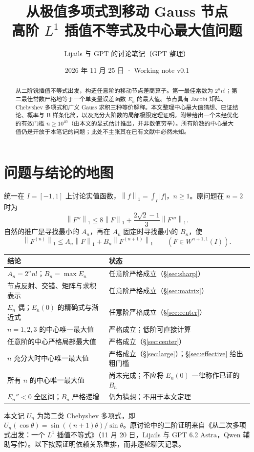 \documentclass[11pt,a4paper,fontset=fandol]{ctexart}
\title{\vspace{-1em}从极值多项式到移动 Gauss 节点\\[5pt]\large 高阶 $L^1$ 插值不等式及中心最大值问题}
\author{Lijails 与 GPT 的讨论笔记（GPT 整理）}
\date{2026 年 11 月 25 日 · Working note v0.1}
\newcommand{\norm}[1]{\left\|#1\right\|_1}
\theoremstyle{remark}\newtheorem{conjecture}{猜想}
\begin{document}
\maketitle
\begin{abstract}
从二阶锐插值不等式出发，构造任意阶的移动节点差商算子。第一最佳常数为 $2^n n!$；第二最佳常数严格地等于一个单变量误差函数 $E_n$ 的最大值。节点具有 Jacobi 矩阵、Chebyshev 多项式和广义 Gauss 求积三种等价解释。本文整理中心最大值猜想、已证结论、概率与 B 样条化简，以及充分大阶数的局部极限定理证明。附带给出一个未经优化的有效门槛 $n\ge 10^{40}$（由本文的显式估计推出，并非数值穷举）。所有阶数的中心最大值仍是开放于本笔记的问题；此处不主张其在已有文献中必然未知。
\end{abstract}
\setcounter{tocdepth}{1}
\tableofcontents
\clearpage

\section{问题与结论的地图}
统一在 $I=[-1,1]$ 上讨论实值函数，$\norm{f}=\int_I|f|$，$n\ge1$。原问题在 $n=2$ 时为
\[
 \norm{F''}\le 8\norm F+\frac{2\sqrt2-1}{3}\norm{F'''}.
\]
自然的推广是寻找最小的 $A_n$，再在 $A_n$ 固定时寻找最小的 $B_n$，使
\begin{equation}\label{main}
 \norm{F^{(n)}}\le A_n\norm F+B_n\norm{F^{(n+1)}}\qquad(F\in W^{n+1,1}(I)).
\end{equation}
\begin{center}
\begin{tabular}{p{.48\linewidth}p{.43\linewidth}}
\toprule 结论 & 状态\\ \midrule
$A_n=2^n n!$；$B_n=\max E_n$ & 任意阶严格成立（\S\ref{sec:sharp}）\\
节点反射、交错、矩阵与求积表示 & 任意阶严格成立（\S\ref{sec:matrix}）\\
$E_n$ 偶；$E_n(0)$ 的精确式与渐近式 & 任意阶严格成立（\S\ref{sec:center}）\\
$n=1,2,3$ 的中心唯一最大值 & 严格成立；低阶可直接计算\\
任意阶的中心严格局部最大值 & 严格成立（\S\ref{sec:center}）\\
$n$ 充分大时中心唯一最大值 & 严格成立（\S\ref{sec:large}）；\S\ref{sec:effective} 给出粗门槛\\
所有 $n$ 的中心唯一最大值 & 尚未完成；不应将 $E_n(0)$ 一律称作已证的 $B_n$\\
$E_n''<0$ 全区间；$B_n$ 严格递增 & 仍为猜想；不用于本文定理\\
\bottomrule
\end{tabular}
\end{center}
本文记 $U_n$ 为第二类 Chebyshev 多项式，即 $U_n(\cos\theta)=\sin((n+1)\theta)/\sin\theta$。原讨论中的二阶证明来自《从二次多项式出发：一个 $L^1$ 插值不等式》（11 月 20 日，Lijails 与 GPT 6.2 Astra，Qwen 辅助写作）。以下按照证明依赖关系重排，而非逐轮聊天记录。
\end{document}
